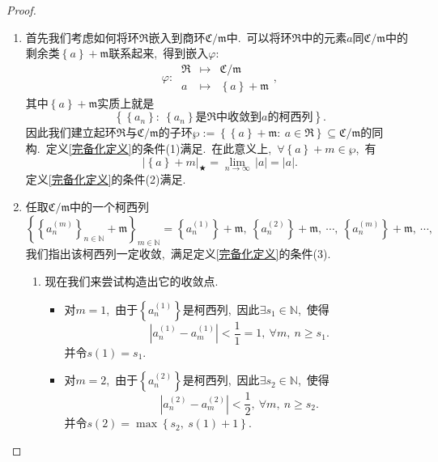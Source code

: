\documentclass[UTF8, twoside]{ctexart}
\theoremstyle{nonumberplain}
\newtheorem{proof}{\heiti 证明}  %
\theoremstyle{nonumberplain}
\theoremstyle{plain}
\begin{document}
	\begin{proof}
		\ 
		\begin{enumerate}
			\item 首先我们考虑如何将环$\Re $嵌入到商环$\mathfrak{C}/\mathfrak{m}$中.\ 可以将环$\Re $中的元素$a$同$\mathfrak{C}/\mathfrak{m}$中的剩余类$\left\{ a \right\}+\mathfrak{m}$联系起来,\ 得到嵌入$\varphi$:\ 
			\[\varphi :\ 
			\begin{matrix}
				\Re  & \mapsto  & \mathfrak{C}/\mathfrak{m}  \\
				a & \mapsto  & 
					\left\{ a \right\}+\mathfrak{m}
			\end{matrix},\]
			其中$\left\{ a \right\}+\mathfrak{m}$实质上就是
			\[
			\left\{ \left\{ {{a}_{n}} \right\}:\ \left\{ {{a}_{n}} \right\}\text{是}\Re\text{中收敛到}a\text{的柯西列} \right\}.
			\]
			因此我们建立起环$\Re $与$\mathfrak{C}/\mathfrak{m}$的子环$\wp :=\left\{ \left\{ a \right\}+\mathfrak{m}:
			\ a\in \Re  \right\}\subseteq \mathfrak{C}/\mathfrak{m}$的同构.\ 
			定义\ref{完备化定义}的条件(1)满足.\ 
			在此意义上,\ $\forall \left\{ a \right\}+m\in \wp $,\ 有
			\[
				{\left| \left\{ a \right\}+m \right|}_{\bigstar}=\underset{n\to \infty }{\mathop{\lim }}\,\left| a \right|=\left| a \right|.
			\]
			定义\ref{完备化定义}的条件(2)满足.\ 
			\vskip 0.3cm
			
			\item 任取$\mathfrak{C}/\mathfrak{m}$中的一个柯西列
			\[
				{{\left\{ {{\left\{ a_{n}^{\left( m \right)} \right\}}_{n\in \mathbb{N}}}+\mathfrak{m} \right\}}_{m\in \mathbb{N}}}=\left\{ a_{n}^{\left( 1 \right)} \right\}+\mathfrak{m},\ \left\{ a_{n}^{\left( 2 \right)} \right\}+\mathfrak{m},\ \cdots ,
				\ \left\{ a_{n}^{\left( m \right)} \right\}+\mathfrak{m},\ \cdots ,
			\]
			我们指出该柯西列一定收敛,\ 满足定义\ref{完备化定义}的条件(3).\ 
			\vskip 0.3cm
			\begin{enumerate}
				\item 现在我们来尝试构造出它的收敛点.\ 
				\begin{itemize}
					\item 对$m=1$,\ 由于$\left\{ a_{n}^{\left( 1 \right)} \right\}$是柯西列,\ 因此$\exists {{s}_{1}}\in \mathbb{N}$,\ 使得
					\[
					\left| a_{n}^{\left( 1 \right)}-a_{m}^{\left( 1 \right)} \right|<\frac{1}{1}=1,
					\ \forall m,\ n\ge {{s}_{1}}.
					\]
					并令$s\left( 1 \right)={{s}_{1}}$.\ 
					
					\item 对$m=2$,\ 由于$\left\{ a_{n}^{\left( 2 \right)} \right\}$是柯西列,\ 因此$\exists {{s}_{2}}\in \mathbb{N}$,\ 使得
					\[
						\left| a_{n}^{\left( 2 \right)}-a_{m}^{\left( 2 \right)} \right|<\frac{1}{2},
						\ \forall m,\ n\ge {{s}_{2}}.
					\]
					并令$s\left( 2 \right)=\max \left\{ {{s}_{2}},\ s\left( 1 \right)+1 \right\}$.\ 
					

\end{itemize}
\end{enumerate}
\end{enumerate}
\end{proof}
\end{document}
